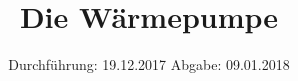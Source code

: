 
\usepackage{wrapfig}
\subject{VERSUCH 206}
\title{Die Wärmepumpe}
\date{%
  \hspace{-2.5em}
  Durchführung: 19.12.2017
  \hspace{4em}
  Abgabe: 09.01.2018
}


  \setlength{\parindent}{0em}
  \maketitle
  \thispagestyle{empty}
  \newpage
  \tableofcontents
  \newpage





\printbibliography{}



